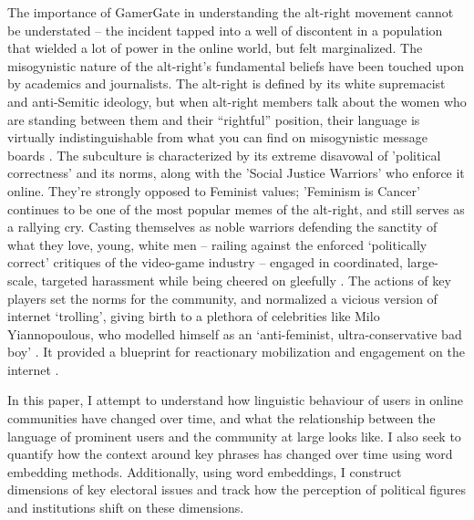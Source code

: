 The importance of GamerGate in understanding the alt-right movement cannot be understated -- the incident tapped into a well of discontent in a population that wielded a lot of power in the online world, but felt marginalized. The misogynistic nature of the alt-right's fundamental beliefs have been touched upon by academics and journalists. The alt-right is defined by its white supremacist and anti-Semitic ideology, but when alt-right members talk about the women who are standing between them and their “rightful” position, their language is virtually indistinguishable from what you can find on misogynistic message boards \citep{league2018women}. The subculture is characterized by its extreme disavowal of 'political correctness' and its norms, along with the 'Social Justice Warriors' who enforce it online. They're strongly opposed to Feminist values; 'Feminism is Cancer' continues to be one of the most popular memes of the alt-right, and still serves as a rallying cry. Casting themselves as noble warriors defending the sanctity of what they love, young, white men -- railing against the enforced ‘politically correct’ critiques of the video-game industry -- engaged in coordinated, large-scale, targeted harassment while being cheered on gleefully \citep{nieborg_mainstreaming_2018}. The actions of key players set the norms for the community, and normalized a vicious version of internet ‘trolling’, giving birth to a plethora of celebrities like Milo Yiannopoulous, who modelled himself as an ‘anti-feminist, ultra-conservative bad boy’ \citep{koulouris_online_2018}. It provided a blueprint for reactionary mobilization and engagement on the internet \citep{daniels_algorithmic_2018}. 
  
In this paper, I attempt to understand how linguistic behaviour of users in online communities have changed over time, and what the relationship between the language of prominent users and the community at large looks like. I also seek to quantify how the context around key phrases has changed over time using word embedding methods. Additionally, using word embeddings, I construct dimensions of key electoral issues and track how the perception of political figures and institutions shift on these dimensions. 